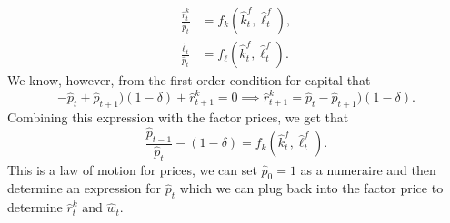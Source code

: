 \documentclass[11pt,english]{article}
\begin{document}
\begin{enumerate}
\begin{solution}
\begin{align*}
\frac{\hat{r}_t^k}{\hat{p}_t} &= f_k\left(\hat{k}_t^f, \hat{\ell}_t^f\right),\\
\frac{\hat{\ell}_t}{\hat{p}_t} &= f_\ell\left(\hat{k}_t^f, \hat{\ell}_t^f\right).
\end{align*} We know, however, from the first order condition for capital that $$-\hat{p}_t + \hat{p}_{t+1})(1 - \delta) + \hat{r}_{t+1}^k = 0 \implies \hat{r}_{t+1}^k = \hat{p}_t - \hat{p}_{t+1})(1 - \delta).$$ Combining this expression with the factor prices, we get that $$\frac{\hat{p}_{t-1}}{\hat{p}_t} - (1 - \delta) =f_k\left(\hat{k}_t^f, \hat{\ell}_t^f\right).$$ This is a law of motion for prices, we can set $\hat{p}_0 = 1$ as a numeraire and then determine an expression for $\hat{p}_t$ which we can plug back into the factor price to determine $\hat{r}_{t}^k$ and $\hat{w}_t$.
    \end{solution}
 

\end{enumerate}
\end{document}
